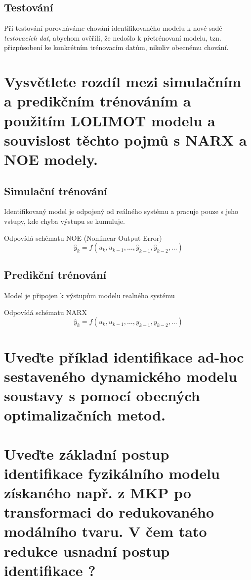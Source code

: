 \documentclass{article}
\begin{document}
	\subsection*{Testování}
	Při testování porovnáváme chování identifikovaného modelu k nové sadě \emph{testovacích dat}, abychom ověřili, že nedošlo k přetrénovaní modelu, tzn. přizpůsobení ke konkrétním trénovacím datům, nikoliv obecnému chování.

	\section{Vysvětlete rozdíl mezi simulačním a predikčním trénováním a použitím LOLIMOT modelu a souvislost těchto pojmů s NARX a NOE modely. }

	\subsection*{Simulační trénování}
	Identifikovaný model je odpojený od reálného systému a pracuje pouze s jeho vstupy, kde chyba výstupu se kumuluje.

	Odpovídá schématu NOE (Nonlinear Output Error)
	\begin{equation}
		\hat{y}_k = f(u_k,u_{k-1},\dots,\hat{y}_{k-1},\hat{y}_{k-2},\dots)
	\end{equation}

	\subsection*{Predikční trénování}
	Model je připojen k výstupům modelu realného systému

	Odpovídá schématu NARX
	\begin{equation}
		\hat{y}_k = f(u_k,u_{k-1},\dots,y_{k-1},y_{k-2},\dots)
	\end{equation}

	\section{Uveďte příklad identifikace ad-hoc sestaveného dynamického modelu soustavy s pomocí obecných optimalizačních metod. }

	\section{Uveďte základní postup identifikace fyzikálního modelu získaného např. z MKP po transformaci do redukovaného modálního tvaru. V čem tato redukce usnadní postup identifikace ? }
	
\end{document}
